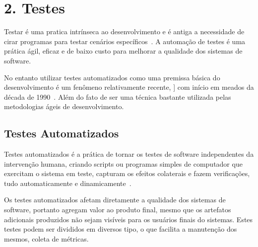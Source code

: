 \chapter{2. Testes}
\label{cap:testes}

Testar é uma pratica intrínseca ao desenvolvimento e é antiga a necessidade de
cirar programas para testar cenários específicos~\cite{everett2007}.
%
A automação de testes é uma prática ágil, eficaz e de baixo custo para melhorar
a qualidade dos sistemas de software.

No entanto utilizar testes automatizados 
como uma premissa básica do desenvolvimento é um fenômeno relativamente recente, ]
com início em meados  da década de 1990~\cite{cotter1995}.
%
Além do fato de ser uma técnica bastante utilizada pelas metodologias ágeis
de desenvolvimento.


\section{Testes Automatizados}

Testes automatizados é a prática de tornar os testes de software independentes da
intervenção humana, criando scripts ou programas simples de computador que exercitam 
o sistema em teste, capturam os efeitos colaterais e fazem verificações, tudo 
automaticamente e dinamicamente~\cite{meszaros2007}.

Os testes automatizados afetam diretamente a qualidade dos sistemas de software,
portanto agregam valor  ao produto final, mesmo que os artefatos adicionais
produzidos não sejam visíveis para os usuários finais do sistemas.
%
Estes testes podem ser divididos em diversos tipo, o que facilita a manutenção 
dos mesmos, coleta de métricas.

